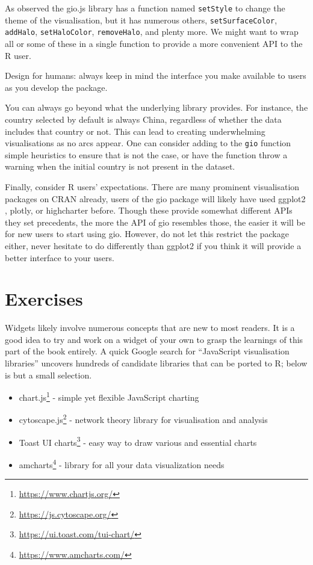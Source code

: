 \documentclass[
  10pt,
]{krantz}
\makeatletter
\providecommand{\tightlist}{%
  \setlength{\itemsep}{0pt}\setlength{\parskip}{0pt}}
\renewcommand{\href}[2]{#2\footnote{\url{#1}}}
\newenvironment{kframe}{%
\medskip{}
\setlength{\fboxsep}{.8em}
 \def\at@end@of@kframe{}%
 \ifinner\ifhmode%
  \def\at@end@of@kframe{\end{minipage}}%
  \begin{minipage}{\columnwidth}%
 \fi\fi%
 \def\FrameCommand##1{\hskip\@totalleftmargin \hskip-\fboxsep
 \colorbox{shadecolor}{##1}\hskip-\fboxsep
     \hskip-\linewidth \hskip-\@totalleftmargin \hskip\columnwidth}%
 \MakeFramed {\advance\hsize-\width
   \@totalleftmargin\z@ \linewidth\hsize
   \@setminipage}}%
 {\par\unskip\endMakeFramed%
 \at@end@of@kframe}
\newenvironment{rmdblock}[1]
  {
  \begin{itemize}
  \renewcommand{\labelitemi}{
    \raisebox{-.7\height}[0pt][0pt]{
      {\setkeys{Gin}{width=3em,keepaspectratio}\texttt{[image: images/\#1]}}
    }
  }
  \setlength{\fboxsep}{1em}
  \begin{kframe}
  \item
  }
  {
  \end{kframe}
  \end{itemize}
  }
\newenvironment{rmdnote}
  {\begin{rmdblock}{note}}
  {\end{rmdblock}}
\makeatother
\begin{document}
As observed the gio.js library has a function named \texttt{setStyle} to change the theme of the visualisation, but it has numerous others, \texttt{setSurfaceColor}, \texttt{addHalo}, \texttt{setHaloColor}, \texttt{removeHalo}, and plenty more. We might want to wrap all or some of these in a single function to provide a more convenient API to the R user.

\begin{rmdnote}
Design for humans: always keep in mind the interface you make available
to users as you develop the package.
\end{rmdnote}

You can always go beyond what the underlying library provides. For instance, the country selected by default is always China, regardless of whether the data includes that country or not. This can lead to creating underwhelming visualisations as no arcs appear. One can consider adding to the \texttt{gio} function simple heuristics to ensure that is not the case, or have the function throw a warning when the initial country is not present in the dataset.

Finally, consider R users' expectations. There are many prominent visualisation packages on CRAN already, users of the gio package will likely have used ggplot2 \citep{R-ggplot2}, plotly, or highcharter before. Though these provide somewhat different APIs they set precedents, the more the API of gio resembles those, the easier it will be for new users to start using gio. However, do not let this restrict the package either, never hesitate to do differently than ggplot2 if you think it will provide a better interface to your users.

\hypertarget{widgets-final-exercises}{%
\section{Exercises}\label{widgets-final-exercises}}

Widgets likely involve numerous concepts that are new to most readers. It is a good idea to try and work on a widget of your own to grasp the learnings of this part of the book entirely. A quick Google search for ``JavaScript visualisation libraries'' uncovers hundreds of candidate libraries that can be ported to R; below is but a small selection.

\begin{itemize}
\tightlist
\item
  \href{https://www.chartjs.org/}{chart.js} - simple yet flexible JavaScript charting
\item
  \href{https://js.cytoscape.org/}{cytoscape.js} - network theory library for visualisation and analysis
\item
  \href{https://ui.toast.com/tui-chart/}{Toast UI charts} - easy way to draw various and essential charts
\item
  \href{https://www.amcharts.com/}{amcharts} - library for all your data visualization needs
\end{itemize}
\end{document}
